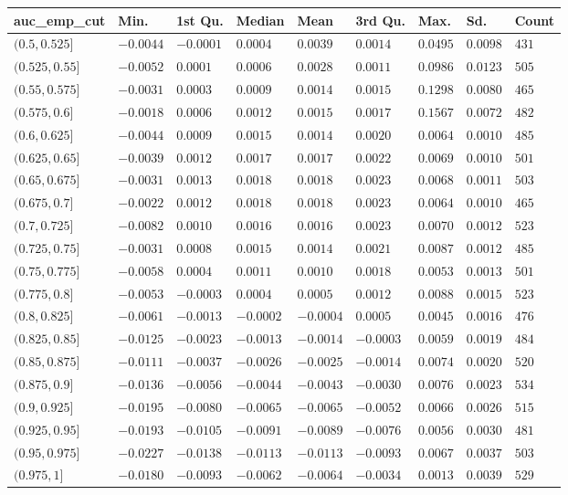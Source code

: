 
\begin{tabular}{l|l|l|l|l|l|l|l|l}
\hline
auc_emp_cut & Min. & 1st Qu. & Median & Mean & 3rd Qu. & Max. & Sd. & Count\\
\hline
$(0.5,0.525]$ & $-0.0044$ & $-0.0001$ & $0.0004$ & $0.0039$ & $0.0014$ & $0.0495$ & $0.0098$ & $431$\\
\hline
$(0.525,0.55]$ & $-0.0052$ & $0.0001$ & $0.0006$ & $0.0028$ & $0.0011$ & $0.0986$ & $0.0123$ & $505$\\
\hline
$(0.55,0.575]$ & $-0.0031$ & $0.0003$ & $0.0009$ & $0.0014$ & $0.0015$ & $0.1298$ & $0.0080$ & $465$\\
\hline
$(0.575,0.6]$ & $-0.0018$ & $0.0006$ & $0.0012$ & $0.0015$ & $0.0017$ & $0.1567$ & $0.0072$ & $482$\\
\hline
$(0.6,0.625]$ & $-0.0044$ & $0.0009$ & $0.0015$ & $0.0014$ & $0.0020$ & $0.0064$ & $0.0010$ & $485$\\
\hline
$(0.625,0.65]$ & $-0.0039$ & $0.0012$ & $0.0017$ & $0.0017$ & $0.0022$ & $0.0069$ & $0.0010$ & $501$\\
\hline
$(0.65,0.675]$ & $-0.0031$ & $0.0013$ & $0.0018$ & $0.0018$ & $0.0023$ & $0.0068$ & $0.0011$ & $503$\\
\hline
$(0.675,0.7]$ & $-0.0022$ & $0.0012$ & $0.0018$ & $0.0018$ & $0.0023$ & $0.0064$ & $0.0010$ & $465$\\
\hline
$(0.7,0.725]$ & $-0.0082$ & $0.0010$ & $0.0016$ & $0.0016$ & $0.0023$ & $0.0070$ & $0.0012$ & $523$\\
\hline
$(0.725,0.75]$ & $-0.0031$ & $0.0008$ & $0.0015$ & $0.0014$ & $0.0021$ & $0.0087$ & $0.0012$ & $485$\\
\hline
$(0.75,0.775]$ & $-0.0058$ & $0.0004$ & $0.0011$ & $0.0010$ & $0.0018$ & $0.0053$ & $0.0013$ & $501$\\
\hline
$(0.775,0.8]$ & $-0.0053$ & $-0.0003$ & $0.0004$ & $0.0005$ & $0.0012$ & $0.0088$ & $0.0015$ & $523$\\
\hline
$(0.8,0.825]$ & $-0.0061$ & $-0.0013$ & $-0.0002$ & $-0.0004$ & $0.0005$ & $0.0045$ & $0.0016$ & $476$\\
\hline
$(0.825,0.85]$ & $-0.0125$ & $-0.0023$ & $-0.0013$ & $-0.0014$ & $-0.0003$ & $0.0059$ & $0.0019$ & $484$\\
\hline
$(0.85,0.875]$ & $-0.0111$ & $-0.0037$ & $-0.0026$ & $-0.0025$ & $-0.0014$ & $0.0074$ & $0.0020$ & $520$\\
\hline
$(0.875,0.9]$ & $-0.0136$ & $-0.0056$ & $-0.0044$ & $-0.0043$ & $-0.0030$ & $0.0076$ & $0.0023$ & $534$\\
\hline
$(0.9,0.925]$ & $-0.0195$ & $-0.0080$ & $-0.0065$ & $-0.0065$ & $-0.0052$ & $0.0066$ & $0.0026$ & $515$\\
\hline
$(0.925,0.95]$ & $-0.0193$ & $-0.0105$ & $-0.0091$ & $-0.0089$ & $-0.0076$ & $0.0056$ & $0.0030$ & $481$\\
\hline
$(0.95,0.975]$ & $-0.0227$ & $-0.0138$ & $\mathbf{-0.0113}$ & $\mathbf{-0.0113}$ & $-0.0093$ & $0.0067$ & $0.0037$ & $503$\\
\hline
$(0.975,1]$ & $-0.0180$ & $-0.0093$ & $-0.0062$ & $-0.0064$ & $-0.0034$ & $0.0013$ & $0.0039$ & $529$\\
\hline
\end{tabular}

